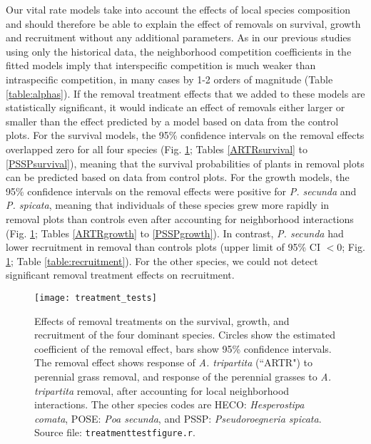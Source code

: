 \documentclass[11pt]{article}
\begin{document}
\begin{doublespacing}
Our vital rate models take into account the effects of local species composition and should therefore be able 
to explain the effect of removals on survival, growth and recruitment without any additional parameters. 
As in our previous studies using only the historical data, the neighborhood competition coefficients in the 
fitted models imply that interspecific competition is much weaker than intraspecific competition, in many
cases by 1-2 orders of magnitude (Table \ref{table:alphas}).  
If the removal treatment effects that we added to these models are statistically significant, it would indicate an effect of 
removals either larger or smaller than the effect predicted by a model based on data from the control plots. 
For the survival models, the 95\% confidence intervals on the removal effects overlapped zero for all four species (Fig. \ref{fig:VitalRateTest}; 
Tables \ref{ARTRsurvival} to \ref{PSSPsurvival}), meaning that the survival probabilities of plants in removal plots can be predicted based on data 
from control plots. For the growth models, the 95\% confidence intervals on the removal effects were positive for \textit{P. secunda}  and \textit{P. spicata},
 meaning that individuals of these species grew more rapidly in removal plots than controls even after accounting for neighborhood interactions 
 (Fig. \ref{fig:VitalRateTest}; Tables \ref{ARTRgrowth} to \ref{PSSPgrowth}). In contrast, \textit{P. secunda} had lower recruitment in removal 
 than controls plots (upper limit of 95\% CI $<0$; Fig. \ref{fig:VitalRateTest}; Table \ref{table:recruitment}). For the other species, 
 we could not detect significant removal treatment effects on recruitment. 

 \begin{figure}[tbp]
 \centering
 \texttt{[image: treatment\_tests]}
 \caption{Effects of removal treatments on the survival, growth, and recruitment of the four dominant species. Circles show the estimated coefficient of the removal effect, bars show 95\% confidence intervals. The removal effect shows response of \textit{A. tripartita} (``ARTR") to perennial grass removal, and response of the perennial grasses to \textit{A. tripartita} removal, after accounting for local neighborhood interactions. The other species codes are HECO: \textit{Hesperostipa comata}, POSE: \textit{Poa secunda}, and PSSP: \textit{Pseudoroegneria spicata}.
 Source file: \texttt{treatment\textunderscore test\textunderscore figure.r}.}
 \label{fig:VitalRateTest}
 \end{figure}


\end{doublespacing}
\end{document}

